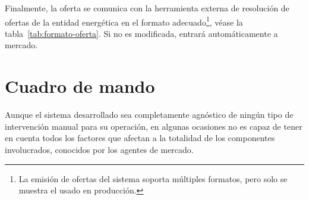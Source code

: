 Finalmente, la oferta se comunica con la herramienta externa de resolución de ofertas de la entidad energética en el formato adecuado\footnote{La emisión de ofertas del sistema soporta múltiples formatos, pero solo se muestra el usado en producción.}, véase la tabla~\ref{tab:formato-oferta}. Si no es modificada, entrará automáticamente a mercado.

\begin{table}[ht]
  \centering
  \caption[Formato de oferta de mercado.]{Formato de oferta de mercado.}%
  \label{tab:formato-oferta}
\end{table}

\section{Cuadro de mando}%
\label{makereference6.2}

Aunque el sistema desarrollado sea completamente agnóstico de ningún tipo de intervención manual para su operación, en algunas ocasiones no es capaz de tener en cuenta todos los factores que afectan a la totalidad de los componentes involucrados, conocidos por los agentes de mercado.

